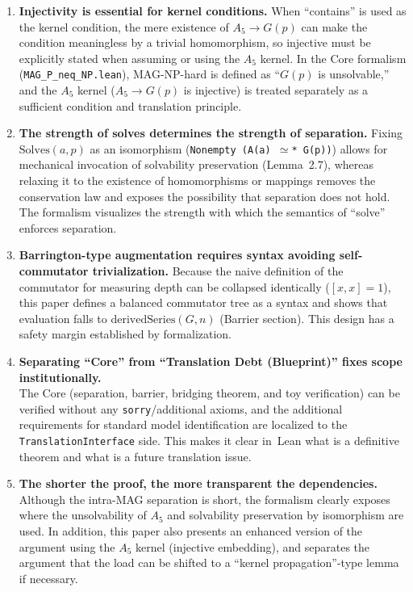 \documentclass[11pt,a4paper]{article}
\theoremstyle{plain}
\theoremstyle{definition}
\newcommand{\Aalt}{A_5}
\newcommand{\Solves}{\mathrm{Solves}}
\newcommand{\TranslationInterface}{\texttt{TranslationInterface}}
\newcommand{\lean}[1]{\texttt{#1}}
\begin{document}
\begin{enumerate}
\item \textbf{Injectivity is essential for kernel conditions.} When ``contains'' is used as the kernel condition, the mere existence of $\Aalt \to G(p)$ can make the condition meaningless by a trivial homomorphism, so injective must be explicitly stated when assuming or using the $\Aalt$ kernel. In the Core formalism (\lean{MAG\_P\_neq\_NP.lean}), MAG-NP-hard is defined as ``$G(p)$ is unsolvable,'' and the $\Aalt$ kernel ($\Aalt \to G(p)$ is injective) is treated separately as a sufficient condition and translation principle.

\item \textbf{The strength of solves determines the strength of separation.} Fixing $\Solves(a,p)$ as an isomorphism (\lean{Nonempty (A(a) $\simeq$* G(p))}) allows for mechanical invocation of solvability preservation (Lemma~2.7), whereas relaxing it to the existence of homomorphisms or mappings removes the conservation law and exposes the possibility that separation does not hold. The formalism visualizes the strength with which the semantics of ``solve'' enforces separation.

\item \textbf{Barrington-type augmentation requires syntax avoiding self-commutator trivialization.} Because the naive definition of the commutator for measuring depth can be collapsed identically ($[x,x]=1$), this paper defines a balanced commutator tree as a syntax and shows that evaluation falls to $\mathrm{derivedSeries}(G,n)$ (Barrier section). This design has a safety margin established by formalization.

\item \textbf{Separating ``Core'' from ``Translation Debt (Blueprint)'' fixes scope institutionally.}\\
The Core (separation, barrier, bridging theorem, and toy verification) can be verified without any \lean{sorry}/additional axioms, and the additional requirements for standard model identification are localized to the \TranslationInterface{} side. This makes it clear in~Lean what is a definitive theorem and what is a future translation issue.

\item \textbf{The shorter the proof, the more transparent the dependencies.} Although the intra-MAG separation is short, the formalism clearly exposes where the unsolvability of $\Aalt$ and solvability preservation by isomorphism are used. In addition, this paper also presents an enhanced version of the argument using the $\Aalt$ kernel (injective embedding), and separates the argument that the load can be shifted to a ``kernel propagation''-type lemma if necessary.
\end{enumerate}
\end{document}
